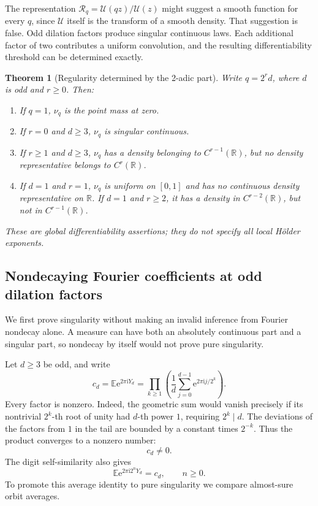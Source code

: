 \documentclass[11pt,letterpaper]{article}
\numberwithin{equation}{section}
\newtheorem{theorem}{Theorem}[section]
\theoremstyle{definition}
\theoremstyle{remark}
\newcommand{\R}{\mathbb R}
\newcommand{\ii}{\mathrm i}
\newcommand{\E}{\mathbb E}
\newcommand{\Up}{\mathcal U}
\newcommand{\Rp}{\mathcal R}
\newcommand{\e}{\mathrm e}
\begin{document}
The representation \(\Rp_q=\Up(qz)/\Up(z)\) might suggest a smooth function for every \(q\), since \(\Up\) itself is the transform of a smooth density. That suggestion is false. Odd dilation factors produce singular continuous laws. Each additional factor of two contributes a uniform convolution, and the resulting differentiability threshold can be determined exactly.

\begin{theorem}[Regularity determined by the 2-adic part]
\label{thm:regularity}
Write \(q=2^rd\), where \(d\) is odd and \(r\geq0\). Then:
\begin{enumerate}[label=(\roman*)]
\item If \(q=1\), \(\nu_q\) is the point mass at zero.
\item If \(r=0\) and \(d\geq3\), \(\nu_q\) is singular continuous.
\item If \(r\geq1\) and \(d\geq3\), \(\nu_q\) has a density belonging to \(C^{r-1}(\R)\), but no density representative belongs to \(C^r(\R)\).
\item If \(d=1\) and \(r=1\), \(\nu_q\) is uniform on \([0,1]\) and has no continuous density representative on \(\R\). If \(d=1\) and \(r\geq2\), it has a density in \(C^{r-2}(\R)\), but not in \(C^{r-1}(\R)\).
\end{enumerate}
These are global differentiability assertions; they do not specify all local H\"older exponents.
\end{theorem}

\subsection{Nondecaying Fourier coefficients at odd dilation factors}
We first prove singularity without making an invalid inference from Fourier nondecay alone. A measure can have both an absolutely continuous part and a singular part, so nondecay by itself would not prove pure singularity.

Let \(d\geq3\) be odd, and write
\[
 c_d=\E\e^{2\pi\ii Y_d}
 =\prod_{k\geq1}\left(\frac1d\sum_{j=0}^{d-1}
                                \e^{2\pi\ii j/2^k}\right).
\]
Every factor is nonzero. Indeed, the geometric sum would vanish precisely if its nontrivial \(2^k\)-th root of unity had \(d\)-th power \(1\), requiring \(2^k\mid d\). The deviations of the factors from \(1\) in the tail are bounded by a constant times \(2^{-k}\). Thus the product converges to a nonzero number:
\begin{equation}
 c_d\ne0.
 \label{eq:cdnonzero}
\end{equation}
The digit self-similarity also gives
\begin{equation}
 \E\e^{2\pi\ii 2^nY_d}=c_d,\qquad n\geq0.
\end{equation}
To promote this average identity to pure singularity we compare almost-sure orbit averages.
\end{document}
